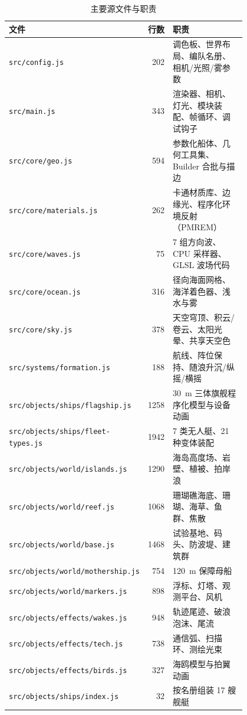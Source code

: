 \documentclass[UTF8, a4paper, 11pt]{ctexart}
\newcommand{\file}[1]{\texttt{#1}}
\begin{document}
\begin{table}[H]
\centering
\caption{主要源文件与职责}
\label{tab:files}
\small
\begin{tabular}{@{}p{0.345\linewidth}r p{0.46\linewidth}@{}}
\toprule
\textbf{文件} & \textbf{行数} & \textbf{职责} \\
\midrule
\file{src/config.js} & 202 & 调色板、世界布局、编队名册、相机/光照/雾参数 \\
\file{src/main.js} & 343 & 渲染器、相机、灯光、模块装配、帧循环、调试钩子 \\
\file{src/core/geo.js} & 594 & 参数化船体、几何工具集、Builder 合批与描边 \\
\file{src/core/materials.js} & 262 & 卡通材质库、边缘光、程序化环境反射（PMREM） \\
\file{src/core/waves.js} & 75 & 7 组方向波、CPU 采样器、GLSL 波场代码 \\
\file{src/core/ocean.js} & 316 & 径向海面网格、海洋着色器、浅水与雾 \\
\file{src/core/sky.js} & 378 & 天空穹顶、积云/卷云、太阳光晕、共享天空色 \\
\file{src/systems/formation.js} & 188 & 航线、阵位保持、随浪升沉/纵摇/横摇 \\
\file{src/objects/ships/flagship.js} & 1258 & 30~m 三体旗舰程序化模型与设备动画 \\
\file{src/objects/ships/fleet-types.js} & 1942 & 7 类无人艇、21 种变体装配 \\
\file{src/objects/world/islands.js} & 1290 & 海岛高度场、岩壁、植被、拍岸浪 \\
\file{src/objects/world/reef.js} & 1068 & 珊瑚礁海底、珊瑚、海草、鱼群、焦散 \\
\file{src/objects/world/base.js} & 1468 & 试验基地、码头、防波堤、建筑群 \\
\file{src/objects/world/mothership.js} & 754 & 120~m 保障母船 \\
\file{src/objects/world/markers.js} & 898 & 浮标、灯塔、观测平台、风机 \\
\file{src/objects/effects/wakes.js} & 948 & 轨迹尾迹、破浪泡沫、尾流 \\
\file{src/objects/effects/tech.js} & 738 & 通信弧、扫描环、测绘光束 \\
\file{src/objects/effects/birds.js} & 327 & 海鸥模型与拍翼动画 \\
\file{src/objects/ships/index.js} & 32 & 按名册组装 17 艘舰艇 \\
\bottomrule
\end{tabular}
\end{table}
\end{document}
